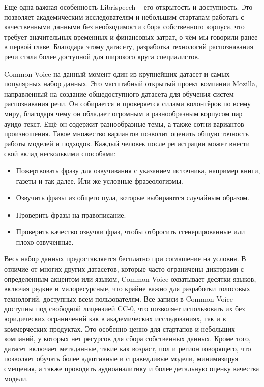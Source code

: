 Еще одна важная особенность Librispeech -- его открытость и доступность.
Это позволяет академическим исследователям и небольшим стартапам работать с качественными данными без необходимости сбора собственного корпуса, что требует значительных временных и финансовых затрат, о чём мы говорили ранее в первой главе.
Благодаря этому датасету, разработка технологий распознавания речи стала более доступной для широкого круга специалистов.

Common Voice на данный момент один из крупнейших датасет и самых популярных набор данных.
Это масштабный открытый проект компании Mozilla, направленный на создание общедоступного датасета для обучения систем распознавания речи. 
Он собирается и проверяется силами волонтёров по всему миру, благодаря чему он обладает огромным и разнообразным корпусом пар ауидо-текст.
Ещё он содержит разнообразные темы, а также сотни вариантов произношения.
Такое множество вариантов позволит оценить общую точность работы моделей и подходов.
Каждый человек после регистрации может  внести свой вклад несколькими способами:
\begin{itemize}
  \item Пожертвовать фразу для озвучивания с указанием источника, например книги, газеты и так далее.
    Или же условные фразеологизмы.
  \item Озвучить фразы из общего пула, которые выбираются случайным образом.
  \item Проверить фразы на правописание.
  \item Проверить качество озвучки фраз, чтобы отбросить сгенерированные или плохо озвученные.
\end{itemize}
Весь набор данных предоставляется бесплатно при соглашение на условия.
В отличие от многих других датасетов, которые часто ограничены дикторами с определенным акцентом или языком, Common Voice охватывает десятки языков, включая редкие и малоресурсные, что крайне важно для разработки голосовых технологий, доступных всем пользователям.
Все записи в Common Voice доступны под свободной лицензией CC-0, что позволяет использовать их без юридических ограничений как в академических исследованиях, так и в коммерческих продуктах.
Это особенно ценно для стартапов и небольших компаний, у которых нет ресурсов для сбора собственных данных.
Кроме того, датасет включает метаданные, такие как возраст, пол и регион говорящего, что позволяет обучать более адаптивные и справедливые модели, минимизируя смещения, а также проводить аудиоаналитику и более детальную оценку качества модели.

